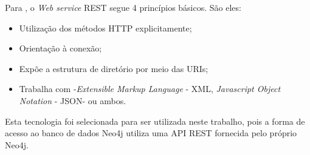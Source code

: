 
Para , o \textit{Web service} REST segue 4 princípios básicos. São eles: 

\begin{itemize}
	\item Utilização dos métodos HTTP explicitamente;
	\item Orientação à conexão;
	\item Expõe a estrutura de diretório por meio das URIs;
	\item Trabalha com -\textit{Extensible Markup Language} - XML\footnotemark[21], \textit{Javascript Object Notation} - JSON\footnotemark[22] - ou ambos.
\end{itemize}



Esta tecnologia foi selecionada para ser utilizada neste trabalho, pois a forma de acesso ao banco de dados Neo4j utiliza uma API REST fornecida pelo próprio Neo4j.